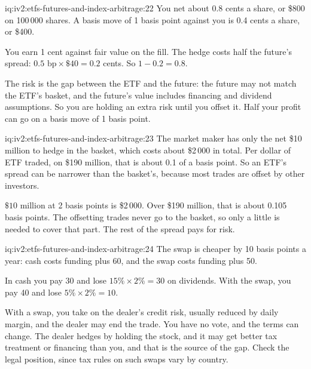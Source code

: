 \begin{solution}{iq:iv2:etfs-futures-and-index-arbitrage:22}
You net about 0.8 cents a share, or \$800 on 100\,000 shares. A basis move of 1 basis point against you is 0.4 cents a share, or \$400.

You earn 1 cent against fair value on the fill. The hedge costs half the future's spread: $0.5 \text{ bp} \times \$40 = 0.2$ cents. So $1 - 0.2 = 0.8$.

The risk is the gap between the ETF and the future: the future may not match the ETF's basket, and the future's value includes financing and dividend assumptions. So you are holding an extra risk until you offset it. Half your profit can go on a basis move of 1 basis point.

\end{solution}

\begin{solution}{iq:iv2:etfs-futures-and-index-arbitrage:23}
The market maker has only the net \$10 million to hedge in the basket, which costs about \$2\,000 in total. Per dollar of ETF traded, on \$190 million, that is about 0.1 of a basis point. So an ETF's spread can be narrower than the basket's, because most trades are offset by other investors.

$\$10$ million at 2 basis points is \$2\,000. Over \$190 million, that is about 0.105 basis points. The offsetting trades never go to the basket, so only a little is needed to cover that part. The rest of the spread pays for risk.

\end{solution}

\begin{solution}{iq:iv2:etfs-futures-and-index-arbitrage:24}
The swap is cheaper by 10 basis points a year: cash costs funding plus 60, and the swap costs funding plus 50.

In cash you pay 30 and lose $15\% \times 2\% = 30$ on dividends. With the swap, you pay 40 and lose $5\% \times 2\% = 10$.

With a swap, you take on the dealer's credit risk, usually reduced by daily margin, and the dealer may end the trade. You have no vote, and the terms can change. The dealer hedges by holding the stock, and it may get better tax treatment or financing than you, and that is the source of the gap. Check the legal position, since tax rules on such swaps vary by country.

\end{solution}

